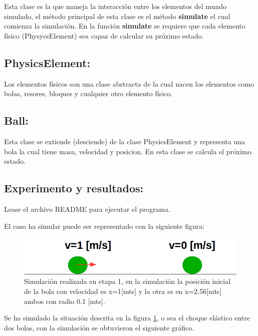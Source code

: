 \documentclass[a4paper,10pt]{article}
\begin{document}
Esta clase es la que maneja la interacción entre los elementos del mundo simulado, el método principal de esta clase es el método \textbf{simulate}
el cual comienza la simulación. En la función \textbf{simulate} 
se requiere que cada elemento físico (PhysycsElement) sea capaz de calcular su próximo estado.\newline

\subsection{PhysicsElement:}


Los elementos físicos son una clase abstracta de la cual nacen los elementos como bolas, resores, bloques y cualquier otro elemento físico.\newline

\subsection{Ball:}


Esta clase se extiende (desciende) de la clase PhysicsElement y representa una bola la cual tiene masa, velocidad y posicion. En esta clase 
se calcula el próximo estado.\newline


\subsection{Experimento y resultados:}

Lease el archivo README para ejecutar el programa.\newline

El caso ha simular puede ser representado con la siguiente figura:

\begin{figure}[H]
 \centering
 \includegraphics[scale=0.3]{./FigureA.png}
 \caption{Simulación realizada en etapa 1, en la simulación la posición inicial de la bola con velocidad es x=1[mts] y la otra es en x=2.56[mts] ambos con radio 0.1 [mts].}
  \label{etapa1.1}
\end{figure}


Se ha simulado la situación descrita en la figura \ref{etapa1.1}, o sea el choque elástico entre dos
bolas, con la simulación se obtuvieron el siguiente gráfico.
\end{document}
